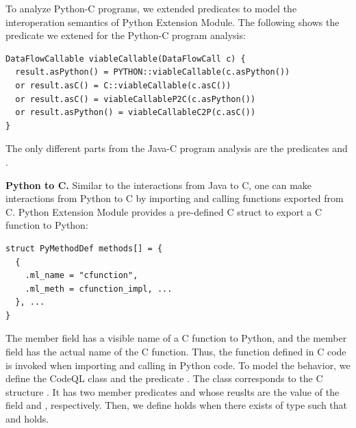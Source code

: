 To analyze Python-C programs, we extended predicates to model the
interoperation semantics of Python Extension Module.
The following shows the  predicate we extened for the
Python-C program analysis: 

\begin{lstlisting}[style=codeql,xleftmargin=-.5em,numbers=none]
DataFlowCallable viableCallable(DataFlowCall c) {
  result.asPython() = PYTHON::viableCallable(c.asPython())
  or result.asC() = C::viableCallable(c.asC())
  or result.asC() = viableCallableP2C(c.asPython())
  or result.asPython() = viableCallableC2P(c.asC())
}
\end{lstlisting}

\noindent
The only different parts from the Java-C program analysis are the predicates
 and .


\textbf{Python to C.} Similar to the interactions from Java to C, one can make
interactions from Python to C by importing and calling functions exported from
C. Python Extension Module provides a pre-defined C struct  to
export a C function to Python: 

\begin{lstlisting}[style=mcpp]
struct PyMethodDef methods[] = {
  {
    .ml_name = "cfunction",
    .ml_meth = cfunction_impl, ...
  }, ...
}
\end{lstlisting}

\noindent
The member field  has a visible name of a C function to Python,
and the member field  has the actual name of the C function.
Thus, the function  defined in C code is invoked when
importing and calling  in Python code.
To model the behavior, we define the CodeQL class 
and the predicate . The class 
corresponds to the C structure . It has
two member predicates  and  whose reuslts are
the value of the field  and , respectively.  Then, we define
 holds when there exists 
of type  such that  and
  holds.

